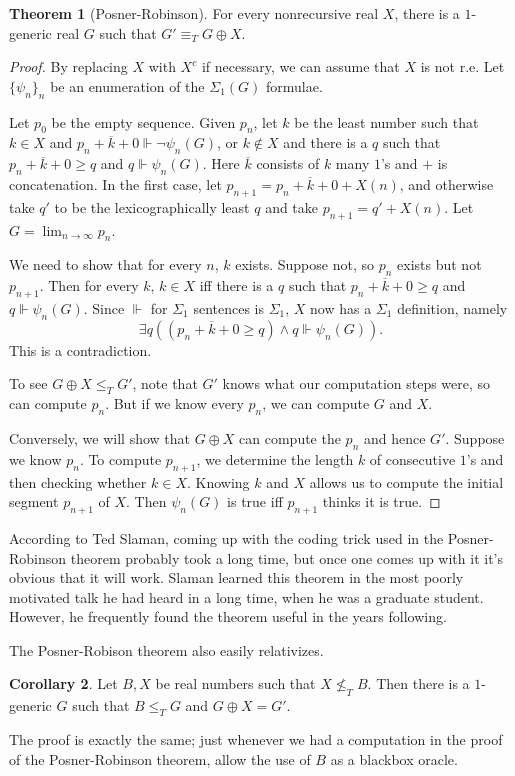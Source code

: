 \documentclass[12pt]{report}
\newcommand{\forces}{\Vdash}
\theoremstyle{definition}
\newtheorem{theorem}{Theorem}[chapter]
\newtheorem{corollary}[theorem]{Corollary}
\begin{document}
\begin{theorem}[Posner-Robinson]
For every nonrecursive real $X$, there is a $1$-generic real $G$ such that $G' \equiv_T G \oplus X$.
\end{theorem}
\begin{proof}
By replacing $X$ with $X^c$ if necessary, we can assume that $X$ is not r.e.
Let $\{\psi_n\}_n$ be an enumeration of the $\Sigma_1(G)$ formulae.

Let $p_0$ be the empty sequence.
Given $p_n$, let $k$ be the least number such that $k \in X$ and $p_n + \overline k + 0 \forces \neg \psi_n(G)$, or $k \notin X$ and there is a $q$ such that $p_n + \overline k + 0 \geq q$ and $q \forces \psi_n(G)$.
Here $\overline k$ consists of $k$ many $1$'s and $+$ is concatenation.
In the first case, let $p_{n+1} = p_n + \overline k + 0 + X(n)$, and otherwise take $q'$ to be the lexicographically least $q$ and take $p_{n+1} = q' + X(n)$.
Let $G = \lim_{n \to \infty} p_n$.

We need to show that for every $n$, $k$ exists. Suppose not, so $p_n$ exists but not $p_{n+1}$. Then for every $k$, $k \in X$ iff there is a $q$ such that $p_n + \overline k + 0 \geq q$ and $q \forces \psi_n(G)$.
Since $\forces$ for $\Sigma_1$ sentences is $\Sigma_1$, $X$ now has a $\Sigma_1$ definition, namely
$$\exists q((p_n + \overline k + 0 \geq q) \wedge q \forces \psi_n(G)).$$
This is a contradiction.

To see $G \oplus X \leq_T G'$, note that $G'$ knows what our computation steps were, so can compute $p_n$. But if we know every $p_n$, we can compute $G$ and $X$.

Conversely, we will show that $G \oplus X$ can compute the $p_n$ and hence $G'$. Suppose we know $p_n$. To compute $p_{n+1}$, we determine the length $k$ of consecutive $1$'s and then checking whether $k \in X$. Knowing $k$ and $X$ allows us to compute the initial segment $p_{n+1}$ of $X$. Then $\psi_n(G)$ is true iff $p_{n+1}$ thinks it is true.
\end{proof}
According to Ted Slaman, coming up with the coding trick used in the Posner-Robinson theorem probably took a long time, but once one comes up with it it's obvious that it will work.
Slaman learned this theorem in the most poorly motivated talk he had heard in a long time, when he was a graduate student.
However, he frequently found the theorem useful in the years following.

The Posner-Robison theorem also easily relativizes.
\begin{corollary}
Let $B,X$ be real numbers such that $X \not\leq_T B$. Then there is a $1$-generic $G$ such that $B \leq_T G$ and $G \oplus X = G'$.
\end{corollary}
The proof is exactly the same; just whenever we had a computation in the proof of the Posner-Robinson theorem, allow the use of $B$ as a blackbox oracle.
\end{document}
